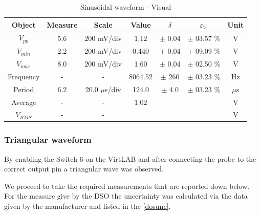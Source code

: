 \documentclass[../main.tex]{subfiles}
\begin{document}
\begin{table}[h!]
\centering	

\begin{tabular}{ccccccc}
\textbf{Object} & \textbf{Measure} & \textbf{Scale}  & \textbf{Value}  & \textbf{$\delta$} & \textbf{$\varepsilon_{\%}$} & \textbf{Unit} \\
\hline
 $V_{pp}$ & 5.6 &  200 mV/div & 1.12 & $\pm$ 0.04 & $\pm$ 03.57 \% & V \\
 \hline
 $V_{min}$ & 2.2  &  200 mV/div  & 0.440  & $\pm$ 0.04 & $\pm$ 09.09 \% &  V \\
 \hline
 $V_{max}$ & 8.0  &  200 mV/div &  1.60 & $\pm$ 0.04 & $\pm$ 02.50 \%& V  \\
 \hline
 Frequency & -  & -  & 8064.52 & $\pm$ 260 & $\pm$ 03.23 \% & Hz \\
 \hline
 Period & 6.2 &  20.0 $\mu$s/div & 124.0 & $\pm$ 4.0 & $\pm$ 03.23 \%  & $\mu$s \\
 \hline
 Average & - & - &  1.02 &   & &  V \\ 
 \hline
 $V_{RMS}$ & - & - &    &  &  & V \\
 

\end{tabular}
\caption*{Sinusoidal waveform - Visual}
\end{table}


\subsubsection*{Triangular waveform}

By enabling the Switch 6 on the VirtLAB and after connecting the probe to the correct output pin a triangular wave was observed.


We proceed to take the required measurements that are reported down below.
For the measure give by the DSO the uncertainty was calculated via the data given by the manufacturer and listed in the \autoref{dosunc}.
\end{document}
